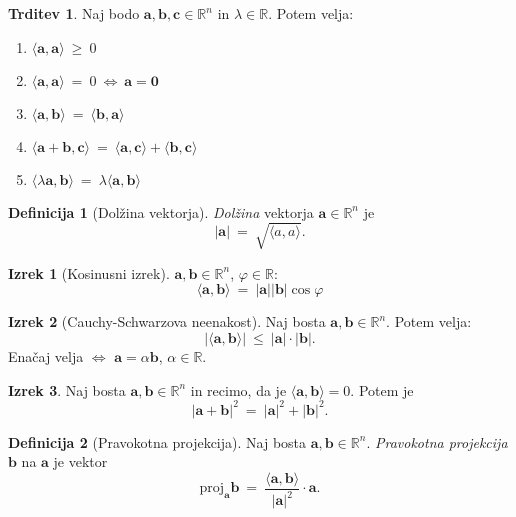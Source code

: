 \documentclass[11pt]{article}
\newcommand{\R}{\mathbb{R}}
\newcommand{\ls}{\langle}
\newcommand{\rs}{\rangle}
\renewcommand{\a}{\mathbf{a}}
\renewcommand{\b}{\mathbf{b}}
\renewcommand{\c}{\mathbf{c}}
\newcommand{\0}{\mathbf{0}}
\theoremstyle{definition}
\newtheorem{definicija}{Definicija}[section]
\theoremstyle{definition}
\newtheorem{trditev}{Trditev}[section]
\theoremstyle{definition}
\newtheorem{izrek}{Izrek}[section]
\theoremstyle{definition}
\begin{document}
\begin{trditev}

Naj bodo $\a,\b,\c \in \R^n$ in $\lambda \in \R$. Potem velja:
\begin{enumerate}
	\item $\ls \a, \a \rs ~\geq~ 0$
	\item $\ls \a, \a \rs ~=~ 0 ~\iff~ \a = \0$
	\item $\ls \a, \b \rs ~=~ \ls \b, \a \rs$
	\item $\ls \a + \b, \c \rs ~=~ \ls \a, \c \rs + \ls \b, \c \rs$
	\item $\ls \lambda\a, \b \rs ~=~ \lambda \ls \a, \b \rs$
\end{enumerate}

\end{trditev}
\vspace{0.5cm}

\begin{definicija}[Dolžina vektorja]

\textit{Dolžina} vektorja $\a \in \R^n$ je
$$|\a| ~=~ \sqrt{\ls a, a \rs}.$$

\end{definicija}
\vspace{0.5cm}

\begin{izrek}[Kosinusni izrek]

$\a,\b \in \R^n$, $\varphi \in \R$:
$$\ls \a, \b \rs ~=~ |\a| |\b| \cos{\varphi}$$

\end{izrek}
\vspace{0.5cm}

\begin{izrek}[Cauchy-Schwarzova neenakost]

Naj bosta $\a,\b \in \R^n$. Potem velja:
$$|\ls \a, \b \rs| ~\leq~ |\a| \cdot |\b|.$$
Enačaj velja $\iff$ $\a = \alpha\b$, $\alpha \in \R$.

\end{izrek}
\vspace{0.5cm}

\begin{izrek}

Naj bosta $\a,\b \in \R^n$ in recimo, da je $\ls \a, \b \rs = 0$. Potem je
$$|\a + \b|^2 ~=~ |\a|^2 + |\b|^2.$$

\end{izrek}
\vspace{0.5cm}

\begin{definicija}[Pravokotna projekcija]

Naj bosta $\a,\b \in \R^n$. \textit{Pravokotna projekcija} $\b$ na $\a$ je vektor
$$\text{proj}_\a{\b} ~=~ \frac{\ls \a, \b \rs}{|\a|^2} \cdot \a.$$

\end{definicija}
\vspace{0.5cm}
\end{document}
